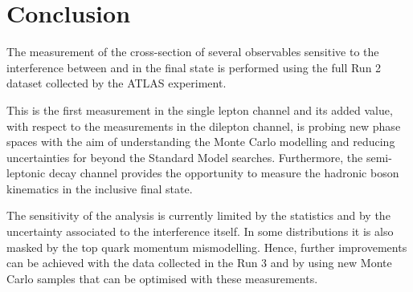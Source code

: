 \chapter{Conclusion}%
\label{ch:conclusion}

The measurement of the cross-section of several observables sensitive to
the interference between \ttbar and \tW in the \WbWb final state is performed
using the full Run 2 dataset collected by the ATLAS experiment. 

This is the first measurement in the single lepton channel and its added value,
with respect to the measurements in the dilepton channel, is probing new phase
spaces with the aim of understanding the Monte Carlo modelling and reducing
uncertainties for beyond the Standard Model searches.
Furthermore, the semi-leptonic decay channel provides the opportunity
to measure the hadronic \Wboson boson kinematics in the inclusive \WbWb final
state.

The sensitivity of the analysis is currently limited by the statistics
and by the uncertainty associated to the interference itself.
In some distributions it is also masked by the top quark momentum mismodelling.
Hence, further improvements can be achieved with the data collected in
the Run 3 and by using new Monte Carlo samples that can be optimised with
these measurements. 
